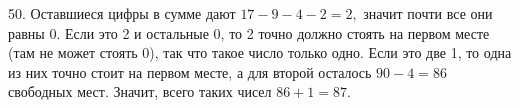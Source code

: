 50. Оставшиеся цифры в сумме дают $17-9-4-2=2,$ значит почти все они равны 0. Если это 2 и остальные 0, то 2 точно должно стоять на первом месте (там не может стоять 0), так что такое число только одно. Если это две 1, то одна из них точно стоит на первом месте, а для второй осталось $90-4=86$ свободных мест. Значит, всего таких чисел $86+1=87.$\\

